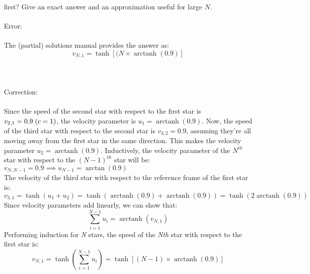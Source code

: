 \documentclass{report}
\theoremstyle{definition}
\DeclareMathOperator{\arctanh}{arctanh}
\begin{document}
first? Give an exact answer and an approximation useful for large $N$.\\\\
Error:\\\\
The (partial) solutions manual provides the answer as:
\begin{equation}
	 	v_{N,1} = \tanh[(N\times\arctanh(0.9)]
\end{equation}\\\\\\
Correction:\\\\
Since the speed of the second star with respect to the first star is $v_{2,1} = 0.9 \hspace{3 pt}(c = 1)$, the velocity parameter is $u_{1} = \arctanh(0.9)$. Now, the speed of the third star with respect to the second star is $v_{3,2} = 0.9$, assuming they're all moving away from the first star in the same direction. This makes the velocity parameter $u_{2} = \arctanh(0.9)$. Inductively, the velocity parameter of the $N^{th}$ star with respect to the $(N-1)^{th}$ star will be: $v_{N,N-1} = 0.9 \implies u_{N-1} = \arctan(0.9)$ \\ 
	The velocity of the third star with respect to the reference frame of the first star is:
	\begin{equation}
	 	v_{3,1} = \tanh(u_{1}+u_{2}) = \tanh(\arctanh(0.9)+\arctanh(0.9)) = \tanh(2\arctanh(0.9))
	\end{equation}
	Since velocity parameters add linearly, we can show that:
	\begin{equation}
		\displaystyle\sum_{i=1}^{N-1}u_{i} = \arctanh(v_{N,1})
	\end{equation}
	Performing induction for {\em N} stars, the speed of the {\em Nth} star with respect to the first star is:
	\begin{equation}
	 	v_{N,1} = \tanh\left(\displaystyle\sum_{i=1}^{N-1}u_{i}\right)= \tanh[(N-1)\times\arctanh(0.9)]
	\end{equation} 
\end{document}
